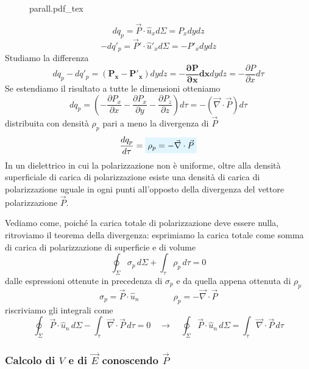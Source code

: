 \documentclass[x11names]{report}
\newcommand{\incfig}[1]{%
	{#1.pdf_tex}
}
\newcommand{\viola}[1]{%
	\colorbox{myblue}{$\displaystyle #1$}
}
\begin{document}
\begin{figure}[H]
	\centering
	\incfig{parall}
\end{figure}

\[
dq_p = \vec{P} \cdot \hat{u}_x d\Sigma = P_x dydz
\]
\[
-dq'_p = \vec{P}'\cdot \hat{u}'_x d\Sigma = -P'_x dydz
\]
Studiamo la differenza
\[
dq_p -dq'_p = \boldsymbol{(P_x - P'_x)}dydz = \boldsymbol{-\frac{\partial P}{\partial x} dx} dy dz = -\frac{\partial P}{\partial x}d\tau
\]
Se estendiamo il risultato a tutte le dimensioni otteniamo 
\[
dq_p = \left(-\frac{\partial P_x}{\partial x}-\frac{\partial P_x}{\partial y}-\frac{\partial P_z}{\partial z}\right)d\tau = -\left(\vec{\nabla}\cdot\vec{P}\right)d\tau
\]
distribuita con densità \(\rho_p\) pari a meno la divergenza di \(\vec{P}\)
\begin{equation}
	 \frac{dq_p}{d\tau} = \viola{\rho_p = -\vec{\nabla}\cdot\vec{P}}
\end{equation}
In un dielettrico in cui la polarizzazione non è uniforme, oltre alla densità superficiale di carica di polarizzazione esiste una densità di carica di polarizzazione uguale in ogni punti all'opposto della divergenza del vettore polarizzazione \(\vec{P}\).

Vediamo come, poiché la carica totale di polarizzazione deve essere nulla, ritroviamo il teorema della divergenza: esprimiamo la carica totale come somma di carica di polarizzazione di superficie e di volume
\[
\oint_\Sigma \sigma_p \, d\Sigma + \int_\tau \rho_p \, d\tau = 0
\]
dalle espressioni ottenute in precedenza di \(\sigma_p\) e da quella appena ottenuta di \(\rho_p\) 
\[
\sigma_p = \vec{P}\cdot\hat{u}_n \qquad \qquad \rho_p = - \vec{\nabla}\cdot\vec{P}
\]
riscriviamo gli integrali come
\[
\oint_\Sigma \vec{P}\cdot\hat{u}_n \, d\Sigma  - \int_\tau \vec{\nabla}\cdot\vec{P} \, d\tau = 0 \quad \to \quad \oint_\Sigma \vec{P}\cdot\hat{u}_n \, d\Sigma  = \int_\tau \vec{\nabla}\cdot\vec{P} \, d\tau
\]

\subsubsection{Calcolo di \(V\) e di \(\vec{E}\) conoscendo \(\vec{P}\)}
\end{document}
